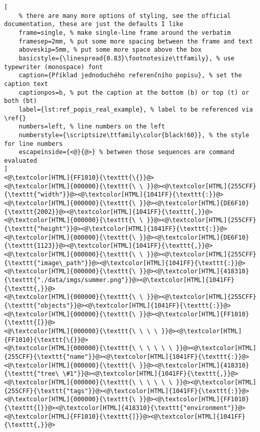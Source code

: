 \clearpage
\begin{lstlisting}[
	% there are many more options of styling, see the official documentation, these are just the defaults I like
	frame=single, % make single-line frame around the verbatim
	framesep=2mm, % put some more spacing between the frame and text
	aboveskip=5mm, % put some more space above the box
	basicstyle={\linespread{0.83}\footnotesize\ttfamily}, % use typewriter (monospace) font
	caption={Příklad jednoduchého referenčního popisu}, % set the caption text
	captionpos=b, % put the caption at the bottom (b) or top (t) or both (bt)
	label={lst:ref_popis_real_example}, % label to be referenced via \ref{}
	numbers=left, % line numbers on the left
	numberstyle={\scriptsize\ttfamily\color{black!60}}, % the style for line numbers
	escapeinside={<@}{@>} % between those sequences are command evaluated
]
<@\textcolor[HTML]{FF1010}{\texttt{\{}}@>
<@\textcolor[HTML]{000000}{\texttt{\ \ }}@><@\textcolor[HTML]{255CFF}{\texttt{"width"}}@><@\textcolor[HTML]{1041FF}{\texttt{:}}@><@\textcolor[HTML]{000000}{\texttt{\ }}@><@\textcolor[HTML]{DE6F10}{\texttt{2002}}@><@\textcolor[HTML]{1041FF}{\texttt{,}}@>
<@\textcolor[HTML]{000000}{\texttt{\ \ }}@><@\textcolor[HTML]{255CFF}{\texttt{"height"}}@><@\textcolor[HTML]{1041FF}{\texttt{:}}@><@\textcolor[HTML]{000000}{\texttt{\ }}@><@\textcolor[HTML]{DE6F10}{\texttt{1123}}@><@\textcolor[HTML]{1041FF}{\texttt{,}}@>
<@\textcolor[HTML]{000000}{\texttt{\ \ }}@><@\textcolor[HTML]{255CFF}{\texttt{"image\_path"}}@><@\textcolor[HTML]{1041FF}{\texttt{:}}@><@\textcolor[HTML]{000000}{\texttt{\ }}@><@\textcolor[HTML]{418310}{\texttt{"./data/imgs/summer.png"}}@><@\textcolor[HTML]{1041FF}{\texttt{,}}@>
<@\textcolor[HTML]{000000}{\texttt{\ \ }}@><@\textcolor[HTML]{255CFF}{\texttt{"objects"}}@><@\textcolor[HTML]{1041FF}{\texttt{:}}@><@\textcolor[HTML]{000000}{\texttt{\ }}@><@\textcolor[HTML]{FF1010}{\texttt{[}}@>
<@\textcolor[HTML]{000000}{\texttt{\ \ \ \ }}@><@\textcolor[HTML]{FF1010}{\texttt{\{}}@>
<@\textcolor[HTML]{000000}{\texttt{\ \ \ \ \ \ }}@><@\textcolor[HTML]{255CFF}{\texttt{"name"}}@><@\textcolor[HTML]{1041FF}{\texttt{:}}@><@\textcolor[HTML]{000000}{\texttt{\ }}@><@\textcolor[HTML]{418310}{\texttt{"tree\ \#1"}}@><@\textcolor[HTML]{1041FF}{\texttt{,}}@>
<@\textcolor[HTML]{000000}{\texttt{\ \ \ \ \ \ }}@><@\textcolor[HTML]{255CFF}{\texttt{"tags"}}@><@\textcolor[HTML]{1041FF}{\texttt{:}}@><@\textcolor[HTML]{000000}{\texttt{\ }}@><@\textcolor[HTML]{FF1010}{\texttt{[}}@><@\textcolor[HTML]{418310}{\texttt{"environment"}}@><@\textcolor[HTML]{FF1010}{\texttt{]}}@><@\textcolor[HTML]{1041FF}{\texttt{,}}@>

\end{lstlisting}
